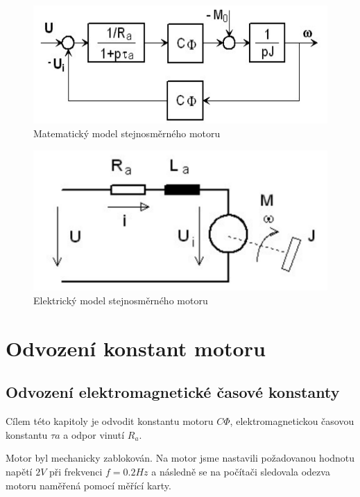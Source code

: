 \documentclass{protokol}
\begin{document}
\begin{figure}[H]
    \centering
    \includegraphics[width=1\linewidth]{ModelSSmotoru.png}
    \caption{Matematický model stejnosměrného motoru}
    \label{fig:ModelSSmotoru}
\end{figure}

\begin{figure}[H]
    \centering
    \includegraphics[width=1\linewidth]{ElektrickyModelSSmotoru.png}
    \caption{Elektrický model stejnosměrného motoru}
    \label{fig:ElektrickyModelSSmotoru}
\end{figure}

\section{Odvození konstant motoru}
\subsection{Odvození elektromagnetické časové konstanty}

Cílem této kapitoly je odvodit konstantu motoru $C\Phi{}$, elektromagnetickou časovou konstantu $\tau{}a$ a odpor vinutí $R_a$. 

Motor byl mechanicky zablokován. Na motor jsme nastavili požadovanou hodnotu napětí $2V$ při frekvenci $f = 0.2Hz$ a následně se na počítači sledovala odezva motoru naměřená pomocí měřící karty.
\end{document}
